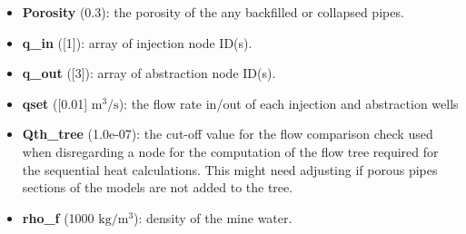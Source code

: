 \begin{itemize}
        List of valid pipe outputs:
        \begin{itemize}
            \item pipe\_id: the id of the pipes as held within the GEMS toolbox. 
            \item Re: the Reynolds number.
            \item v: the water velocity inside the pipe (m/s) assumed uniform. 
            \item Qv: the vectorised flow rate through the pipes (m$^3$/s). Saved as a vector in VTK with an x, y and z component.
            \item Q: the absolute flow rate through the pipes. Is equal to the magnitude of Qv.
            \item poro: the porosity of each pipe.  
            \item rp: the radial distance of the thermal front inside an infinite homogeneous porous rock.
            \item Tp: a vectorised value holding two components labelled x and y. x corresponding to the inflow temperature of the pipe and y to its outflow temperature.
            \item pmod: indicates which case of the statement is used in the heat calculation code. 
            \item Qdiff: the flow difference in the pipe between the last and penultimate iteration in the flow computation.
            \item K: hydraulic conductivity.
            \item d: pipe diameter.
        \end{itemize}
\item {\bf Porosity} (0.3): the porosity of the any backfilled or collapsed pipes.
\item {\bf q\_in} ([1]): array of injection node ID(s).
\item {\bf q\_out} ([3]): array of abstraction node ID(s).
\item {\bf qset} ([0.01] $\mathrm{m^3/s}$): the flow rate in/out of each injection and abstraction wells
\item {\bf Qth\_tree} (1.0e-07): the cut-off value for the flow comparison check used when disregarding a node for the computation of the flow tree required for the sequential heat calculations. This might need adjusting if porous pipes sections of the models are not added to the tree.
\item {\bf rho\_f} (1000 $\mathrm{kg/m^3}$): density of the mine water.

\end{itemize}
